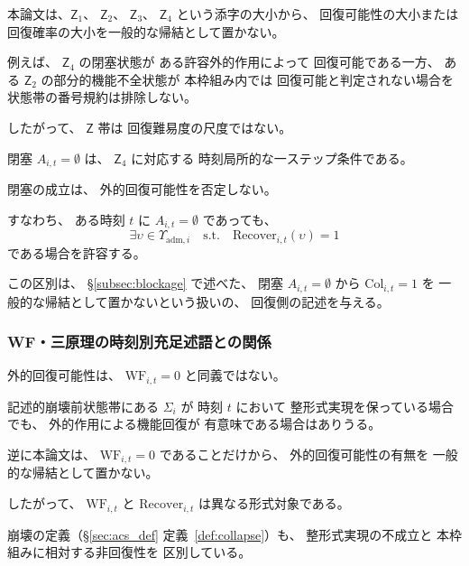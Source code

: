 \begin{remark}[状態帯番号と回復可能性の関係]
\label{rem:zone_not_recoverability_order}
本論文は、$\mathsf{Z}_1$、
$\mathsf{Z}_2$、
$\mathsf{Z}_3$、
$\mathsf{Z}_4$
という添字の大小から、
回復可能性の大小または
回復確率の大小を一般的な帰結として置かない。

例えば、
$\mathsf{Z}_4$
の閉塞状態が
ある許容外的作用によって
回復可能である一方、
ある
$\mathsf{Z}_2$
の部分的機能不全状態が
本枠組み内では
回復可能と判定されない場合を
状態帯の番号規約は排除しない。

したがって、
$\mathsf{Z}$ 帯は
回復難易度の尺度ではない。
\end{remark}

\begin{remark}[閉塞と外的回復可能性]
\label{rem:blockage_external_recovery}
閉塞
$A_{i,t}=\emptyset$
は、
$\mathsf{Z}_4$ に対応する
時刻局所的な一ステップ条件である。

閉塞の成立は、
外的回復可能性を否定しない。

すなわち、
ある時刻 $t$ に
$A_{i,t}=\emptyset$
であっても、
\[
  \exists\upsilon\in\Upsilon_{\mathrm{adm},i}
  \quad\text{s.t.}\quad
  \mathrm{Recover}_{i,t}(\upsilon)=1
\]
である場合を許容する。

この区別は、
\S\ref{subsec:blockage}
で述べた、
閉塞 $A_{i,t}=\emptyset$ から $\mathrm{Col}_{i,t}=1$ を
一般的な帰結として置かないという扱いの、
回復側の記述を与える。
\end{remark}

\subsubsection{WF・三原理の時刻別充足述語との関係}

\begin{remark}[外的回復可能性と整形式実現]
\label{rem:recovery_and_wf}
外的回復可能性は、
$\mathrm{WF}_{i,t}=0$
と同義ではない。

記述的崩壊前状態帯にある
$\Sigma_i$ が
時刻 $t$ において
整形式実現を保っている場合でも、
外的作用による機能回復が
有意味である場合はありうる。

逆に本論文は、
$\mathrm{WF}_{i,t}=0$
であることだけから、
外的回復可能性の有無を
一般的な帰結として置かない。

したがって、
$\mathrm{WF}_{i,t}$
と
$\mathrm{Recover}_{i,t}$
は異なる形式対象である。

崩壊の定義（\S\ref{sec:acs_def} 定義~\ref{def:collapse}）も、
整形式実現の不成立と
本枠組みに相対する非回復性を
区別している。
\end{remark}

